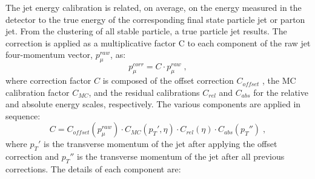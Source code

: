 The jet energy calibration is related,  on average, on the energy measured in
the detector to the true energy of the corresponding final state particle jet or parton jet.
From the clustering  of all stable particle, a true particle jet results. The correction is applied as
a multiplicative factor C to each component of the raw jet four-momentum vector, $p_{\mu}^{raw}$, as:
\newline
\begin{equation}
p_{\mu}^{corr}=C \cdot p_{\mu}^{raw} \; ,
\end{equation}
where correction factor $C$ is composed of the offset correction $C_{offset}$ , the MC calibration
factor $C_{MC}$, and the residual calibrations $C_{rel}$ and $C_{abs}$ for the relative and absolute
energy scales, respectively. The various components are applied in sequence:
\newline
\begin{equation}
C=   C_{offset} ( p_{\mu}^{raw}) \cdot  C_{MC} (p_T',\eta) \cdot C_{rel}(\eta) \cdot  C_{abs} (p_T'') \; ,
\end{equation}
\newline
where $p_T'$ is the transverse momentum of the jet after applying the offset correction and $p_T''$ is the transverse momentum 
of the jet after all previous corrections. The details of each component are:
